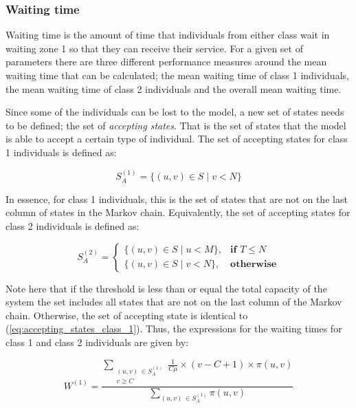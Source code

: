 \subsubsection{Waiting time} \label{sec:waiting_time}

Waiting time is the amount of time that individuals from either class wait in 
waiting zone 1 so that they can receive their service. 
For a given set of parameters there are three different performance measures 
around the mean waiting time that can be calculated; the mean waiting time of
class 1 individuals, the mean waiting time of class 2 individuals and the 
overall mean waiting time. 

Since some of the individuals can be lost to the model, a new set of states 
needs to be defined; the set of \textit{accepting states}. 
That is the set of states that the model is able to accept a certain type of
individual. 
The set of accepting states for class 1 individuals is defined as:

\begin{equation}\label{eq:accepting_states_class_1}
    S_A^{(1)} = \{(u, v) \in S \; | \; v < N \}
\end{equation}

In essence, for class 1 individuals, this is the set of states that are not on 
the last column of states in the Markov chain.
Equivalently, the set of accepting states for class 2 individuals is defined as:

\begin{equation}\label{eq:accepting_states_class_2}
    S_A^{(2)}=
    \begin{cases}
        \{(u, v) \in S \; | \; u < M \}, & \textbf{if } T \leq N\\
        \{(u, v) \in S \; | \; v < N \}, & \textbf{otherwise}
    \end{cases}
\end{equation}

Note here that if the threshold is less than or equal the total capacity of the
system the set includes all states that are not on the last column of the 
Markov chain.
Otherwise, the set of accepting state is identical to 
(\ref{eq:accepting_states_class_1}). Thus, the expressions for the waiting times 
for class 1 and class 2 individuals are given by:

\begin{equation} \label{eq:closed_form_waiting_class_1}
    W^{(1)} = \frac{\sum_{\substack{(u,v) \, \in S_A^{(1)} \\ v \geq C}} 
    \frac{1}{C \mu} \times (v-C+1) \times \pi(u,v)}{\sum_{(u,v) \, 
    \in S_A^{(1)}} \pi(u,v)}
\end{equation}
    

